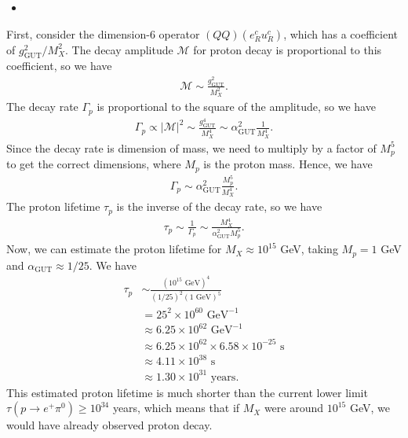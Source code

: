 \begin{itemize}
    \item [(c)]
\end{itemize}
First, consider the dimension-6 operator $(QQ)(e_R^c u_R^c)$, which has a coefficient of $g_\text{GUT}^2/M_X^2$. The decay amplitude $\mathcal{M}$ for proton decay is proportional to this coefficient, so we have
\begin{align}
    \mathcal{M} \sim \frac{g_\text{GUT}^2}{M_X^2}.
\end{align}
The decay rate $\Gamma_p$ is proportional to the square of the amplitude, so we have
\begin{align}
    \Gamma_p \propto |\mathcal{M}|^2 \sim \frac{g_\text{GUT}^4}{M_X^4} \sim \alpha_\text{GUT}^2 \frac{1}{M_X^4}.
\end{align}
Since the decay rate is dimension of mass, we need to multiply by a factor of $M_p^5$ to get the correct dimensions, where $M_p$ is the proton mass. Hence, we have
\begin{align}
    \Gamma_p \sim \alpha_\text{GUT}^2 \frac{M_p^5}{M_X^4}.
\end{align}
The proton lifetime $\tau_p$ is the inverse of the decay rate, so we have
\begin{align}
    \tau_p \sim \frac{1}{\Gamma_p} \sim \frac{M_X^4}{\alpha_\text{GUT}^2 M_p^5}.
\end{align}
Now, we can estimate the proton lifetime for $M_X \approx 10^{15}$ GeV, taking $M_p = 1$ GeV and $\alpha_\text{GUT} \approx 1/25$. We have
\begin{align}
    \tau_p &\sim \frac{(10^{15} \text{ GeV})^4}{(1/25)^2 (1 \text{ GeV})^5} \\
    &= 25^2 \times 10^{60} \text{ GeV}^{-1} \\
    &\approx 6.25 \times 10^{62} \text{ GeV}^{-1}\\
    &\approx 6.25 \times 10^{62} \times 6.58 \times 10^{-25} \text{ s} \\
    &\approx 4.11 \times 10^{38} \text{ s} \\
    &\approx 1.30 \times 10^{31} \text{ years}.
\end{align}
This estimated proton lifetime is much shorter than the current lower limit $\tau(p\to e^+ \pi^0) \geq 10^{34}$ years, which means that if $M_X$ were around $10^{15}$ GeV, we would have already observed proton decay. 

